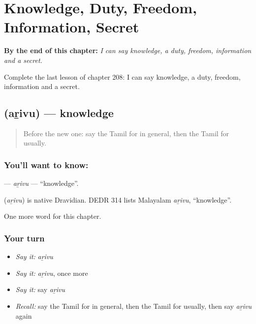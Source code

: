 
\chapter{Knowledge, Duty, Freedom, Information, Secret}
\label{ch:ta-knowledge-duty-freedom-information-secret}

\begin{chapteropening}
\textbf{By the end of this chapter:} \emph{I can say knowledge, a duty, freedom, information and a secret.}

Complete the last lesson of chapter 208: I can say knowledge, a duty, freedom, information and a secret.
\end{chapteropening}

\section[\texorpdfstring{\ta{அறிவு} (aṟivu)}{அறிவு (aṟivu)}]{ (aṟivu) — knowledge}

\label{lesson:TA-C208-arivu}



\begin{quote}
Before the new one: say the Tamil for in general, then the Tamil for usually.
\end{quote}

\subsection*{You'll want to know: }
\textbf{} — \emph{aṟivu} — \textquotedblleft{}knowledge\textquotedblright{}.

\begin{cousinweb}
\textbf{} (\emph{aṟivu}) is native Dravidian. DEDR 314 lists Malayalam \emph{aṟivu}, \textquotedblleft{}knowledge\textquotedblright{}.
\end{cousinweb}

\begin{grammarlens}[title={What you've built}]
One more word for this chapter.
\end{grammarlens}

\subsection*{Your turn}
\begin{itemize}
\raggedright
  \item \emph{Say it:} \emph{aṟivu}
  \item \emph{Say it:} \emph{aṟivu}, once more
  \item \emph{Say it:} say \emph{aṟivu}
  \item \emph{Recall:} say the Tamil for in general, then the Tamil for usually, then say \emph{aṟivu} again
\end{itemize}

